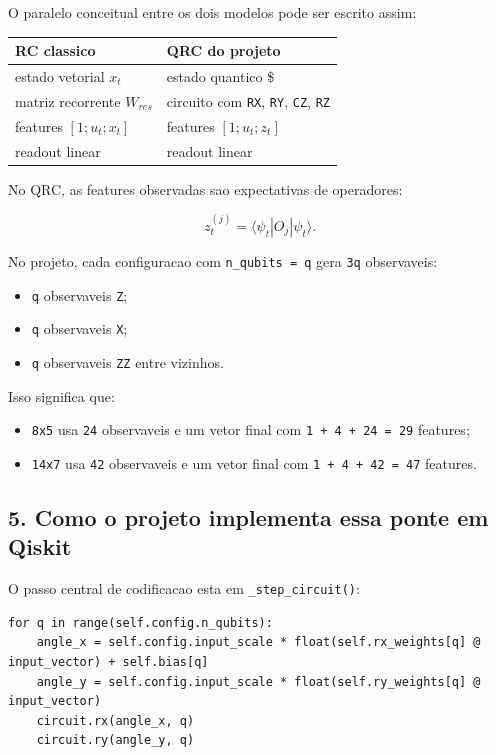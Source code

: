 \documentclass[12pt]{article}
\providecommand{\tightlist}{%
          \setlength{\itemsep}{0pt}\setlength{\parskip}{0pt}}
\begin{document}
O paralelo conceitual entre os dois modelos pode ser escrito assim:

\begin{longtable}[]{@{}ll@{}}
\toprule\noalign{}
RC classico & QRC do projeto \\
\midrule\noalign{}
\endhead
\bottomrule\noalign{}
\endlastfoot
estado vetorial \(x_t\) & estado quantico \$ \\
matriz recorrente \(W_{res}\) & circuito com \texttt{RX}, \texttt{RY}, \texttt{CZ}, \texttt{RZ} \\
features \([1; u_t; x_t]\) & features \([1; u_t; z_t]\) \\
readout linear & readout linear \\
\end{longtable}

No QRC, as features observadas sao expectativas de operadores:

\[
z_t^{(j)} = \langle \psi_t | O_j | \psi_t \rangle.
\]

No projeto, cada configuracao com \texttt{n\_qubits\ =\ q} gera \texttt{3q} observaveis:

\begin{itemize}
\tightlist
\item
  \texttt{q} observaveis \texttt{Z};
\item
  \texttt{q} observaveis \texttt{X};
\item
  \texttt{q} observaveis \texttt{ZZ} entre vizinhos.
\end{itemize}

Isso significa que:

\begin{itemize}
\tightlist
\item
  \texttt{8x5} usa \texttt{24} observaveis e um vetor final com \texttt{1\ +\ 4\ +\ 24\ =\ 29} features;
\item
  \texttt{14x7} usa \texttt{42} observaveis e um vetor final com \texttt{1\ +\ 4\ +\ 42\ =\ 47} features.
\end{itemize}

\subsection{5. Como o projeto implementa essa ponte em Qiskit}\label{5-como-o-projeto-implementa-essa-ponte-em-qiskit}

O passo central de codificacao esta em \texttt{\_step\_circuit()}:

\begin{verbatim}
for q in range(self.config.n_qubits):
    angle_x = self.config.input_scale * float(self.rx_weights[q] @ input_vector) + self.bias[q]
    angle_y = self.config.input_scale * float(self.ry_weights[q] @ input_vector)
    circuit.rx(angle_x, q)
    circuit.ry(angle_y, q)
\end{verbatim}
\end{document}

